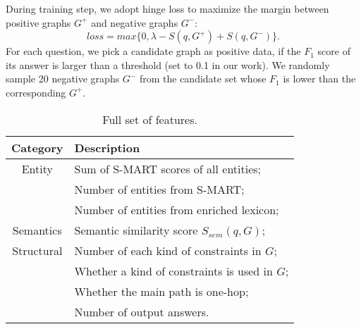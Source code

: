 
%
%
%
%
%
During training step, we adopt hinge loss to maximize the margin
between positive graphs $G^+$ and negative graphs $G^-$:
\begin{equation}
\label{eqn:maxpool}
loss = max\{0, \lambda - S(q, G^+) + S(q, G^-)\}.
\end{equation}
For each question, we pick a candidate graph as positive data,
if the $F_1$ score of its answer is larger than a threshold (set to 0.1 in our work).
We randomly sample 20 negative graphs $G^-$ from the candidate set
whose $F_1$ is lower than the corresponding $G^+$.

\begin{table}[ht]
    \small
    \centering
    \begin{tabular}{|c|l|}
        \hline
        \textbf{Category}    & \textbf{Description}   \\
        \hline
        Entity  & Sum of S-MART scores of all entities; \\
                & Number of entities from S-MART; \\
                & Number of entities from enriched lexicon; \\
        \hline
        Semantics & Semantic similarity score $S_{sem}(q, G)$; \\
        \hline
        Structural  &  Number of each kind of constraints in $G$; \\
                    &  Whether a kind of constraints is used in $G$; \\
                    &  Whether the main path is one-hop; \\
                    &  Number of output answers. \\
        \hline
    \end{tabular}
    \caption{Full set of features.}
    \label{tab:feature}
\end{table}

